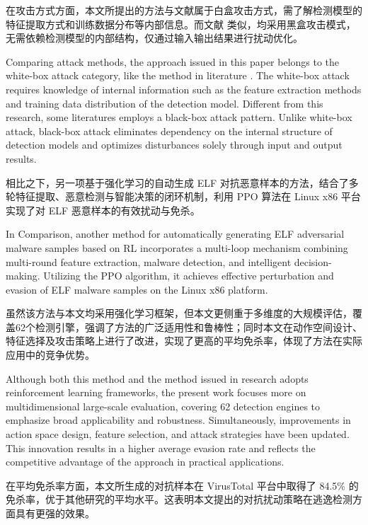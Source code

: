 在攻击方式方面，本文所提出的方法与文献\cite{rathore2021identification}属于白盒攻击方式，需了解检测模型的特征提取方式和训练数据分布等内部信息。而文献\cite{kolosnjaji2018adversarial,quertier2022merlin,song2022mab} 类似，均采用黑盒攻击模式，无需依赖检测模型的内部结构，仅通过输入输出结果进行扰动优化。

Comparing attack methods, the approach issued in this paper belongs to the white-box attack category, like the method in literature \cite{rathore2021identification}. The white-box attack requires knowledge of internal information such as the feature extraction methods and training data distribution of the detection model. Different from this research, some literatures \cite{kolosnjaji2018adversarial,quertier2022merlin,song2022mab} employs a black-box attack pattern. Unlike white-box attack, black-box attack eliminates dependency on the internal structure of detection models and optimizes disturbances solely through input and output results.

相比之下，另一项基于强化学习的自动生成 ELF 对抗恶意样本的方法\cite{xue2024reinforcement}，结合了多轮特征提取、恶意检测与智能决策的闭环机制，利用 PPO 算法在 Linux x86 平台实现了对 ELF 恶意样本的有效扰动与免杀。

In Comparison, another method for automatically generating ELF adversarial malware samples based on RL\cite{xue2024reinforcement} incorporates a multi-loop mechanism combining multi-round feature extraction, malware detection, and intelligent decision-making. Utilizing the PPO algorithm, it achieves effective perturbation and evasion of ELF malware samples on the Linux x86 platform.

虽然该方法与本文均采用强化学习框架，但本文更侧重于多维度的大规模评估，覆盖62个检测引擎，强调了方法的广泛适用性和鲁棒性；同时本文在动作空间设计、特征选择及攻击策略上进行了改进，实现了更高的平均免杀率，体现了方法在实际应用中的竞争优势。

Although both this method and the method issued in research adopts reinforcement learning frameworks, the present work focuses more on multidimensional large-scale evaluation, covering 62 detection engines to emphasize broad applicability and robustness. Simultaneously, improvements in action space design, feature selection, and attack strategies have been updated. This innovation results in a higher average evasion rate and reflects the competitive advantage of the approach in practical applications.

在平均免杀率方面，本文所生成的对抗样本在 VirusTotal 平台中取得了 84.5\% 的免杀率，优于其他研究的平均水平。这表明本文提出的对抗扰动策略在逃逸检测方面具有更强的效果。

